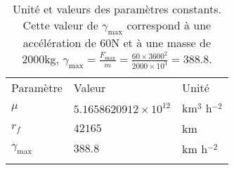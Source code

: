 \begin{table}[ht!]
    \centering
    \begin{tabular}{lll}
        \medhrule
        Param\`etre                                & Valeur & Unit\'e   \\
        \bighrule
        $\mu$                   & $5.1658620912\times10^{12}$  & km$^3$ h$^{-2}$ \\
        $r_f$                   & $42165$                           & km \\
        $\gamma_\mathrm{max}$   & $388.8$                           & km h$^{-2}$ \\
        \medhrule
        \\
    \end{tabular}
    \caption{Unit\'e et valeurs des param\`etres constants. Cette valeur de $\gamma_\mathrm{max}$ correspond \`a une acc\'el\'eration de 60N et \`a
    une masse de 2000kg, \cf $\gamma_\mathrm{max} = \frac{F_\mathrm{max}}{m} = \frac{60 \times 3600^2}{2000 \times 10^3} = 388.8$.}
    \label{table:transfert_temps_min_data}
\end{table}

